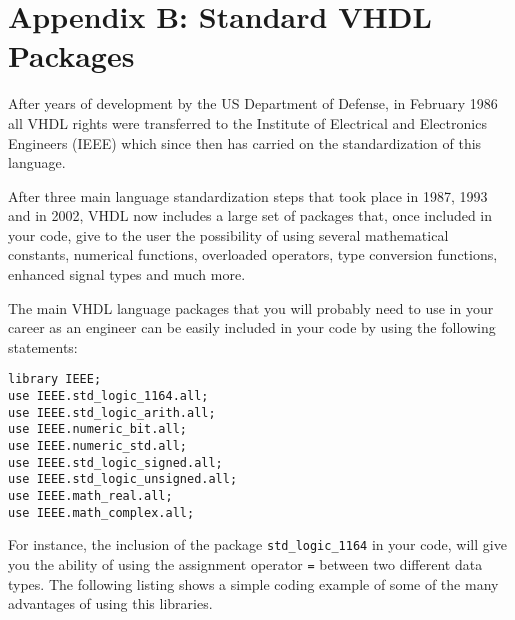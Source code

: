 \chapter{Appendix B: Standard VHDL Packages}
After years of development by the US Department of Defense, in February 1986 all VHDL rights were transferred to the Institute of Electrical and Electronics Engineers (IEEE) which since then has carried on the standardization of this language. 

After three main language standardization steps that took place in 1987, 1993 and in 2002, VHDL now includes a large set of packages that, once included in your code, give to the user the possibility of using several mathematical constants, numerical functions, overloaded operators, type conversion functions, enhanced signal types and much more.

The main VHDL language packages that you will probably need to use in your career as an engineer can be easily included in your code by using the following statements:

\begin{verbatim}
library IEEE;
use IEEE.std_logic_1164.all;
use IEEE.std_logic_arith.all;
use IEEE.numeric_bit.all;
use IEEE.numeric_std.all;
use IEEE.std_logic_signed.all;
use IEEE.std_logic_unsigned.all;
use IEEE.math_real.all;
use IEEE.math_complex.all;
\end{verbatim}

For instance, the inclusion of the package \texttt{std\_logic\_1164} in your code, will give you the ability of using the assignment operator \texttt{=} between two different data types. The following listing shows a simple coding example of some of the many advantages of using this libraries.
\newpage
\clearpage

